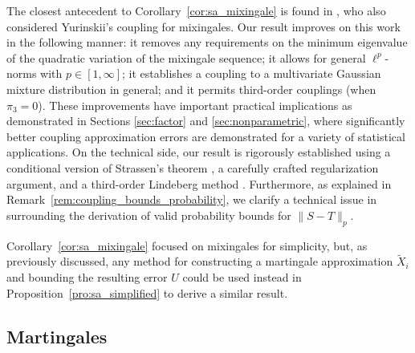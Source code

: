 The closest antecedent to Corollary~\ref{cor:sa_mixingale} is found in
\citet[Theorem~4]{li2020uniform}, who also considered Yurinskii's coupling for
mixingales. Our result improves on this work in the following manner: it
removes any requirements on the minimum eigenvalue of the quadratic variation
of the mixingale sequence; it allows for general $\ell^p$-norms with
$p\in[1,\infty]$; it establishes a coupling to a multivariate Gaussian
mixture distribution in general; and it permits third-order couplings
(when $\pi_3=0$). These improvements have important practical implications as
demonstrated in Sections \ref{sec:factor} and \ref{sec:nonparametric},
where significantly better coupling approximation
errors are demonstrated for a variety of statistical applications. On the
technical side, our result is rigorously established using a conditional
version of Strassen's theorem \citep{chen2020jackknife}, a carefully crafted
regularization argument, and a third-order Lindeberg method
\citep[see][and references therein, for more discussion on the
  standard second-order Lindeberg method]{chatterjee2006generalization}.
Furthermore, as explained in Remark~\ref{rem:coupling_bounds_probability}, we
clarify a technical issue in \citet{li2020uniform} surrounding the derivation
of valid probability bounds for $\|S-T\|_p$.

Corollary~\ref{cor:sa_mixingale} focused on mixingales for simplicity, but, as
previously discussed, any method for constructing a martingale approximation
$\tilde X_i$ and bounding the resulting error $U$ could be used instead in
Proposition~\ref{pro:sa_simplified} to derive a similar result.

\subsection{Martingales}\label{sec:martingales}

